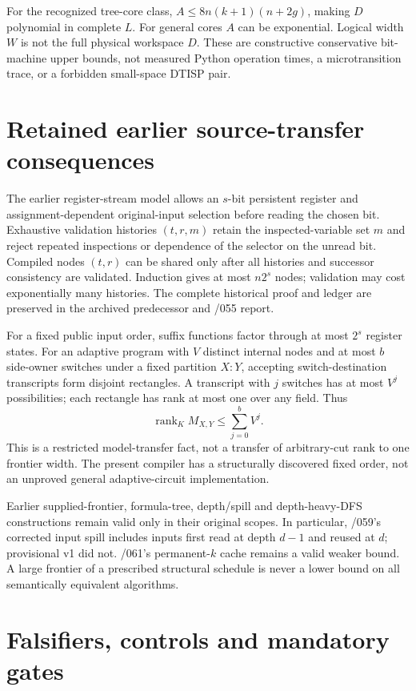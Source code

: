\documentclass[11pt]{article}
\begin{document}
For the recognized tree-core class, $A\le8n(k+1)(n+2g)$, making $D$ polynomial in complete $L$. For general cores $A$ can be exponential. Logical width $W$ is not the full physical workspace $D$. These are constructive conservative bit-machine upper bounds, not measured Python operation times, a microtransition trace, or a forbidden small-space DTISP pair.

\section{Retained earlier source-transfer consequences}
The earlier register-stream model allows an $s$-bit persistent register and assignment-dependent original-input selection before reading the chosen bit. Exhaustive validation histories $(t,r,m)$ retain the inspected-variable set $m$ and reject repeated inspections or dependence of the selector on the unread bit. Compiled nodes $(t,r)$ can be shared only after all histories and successor consistency are validated. Induction gives at most $n2^s$ nodes; validation may cost exponentially many histories. The complete historical proof and ledger are preserved in the archived predecessor and /055 report.

For a fixed public input order, suffix functions factor through at most $2^s$ register states. For an adaptive program with $V$ distinct internal nodes and at most $b$ side-owner switches under a fixed partition $X:Y$, accepting switch-destination transcripts form disjoint rectangles. A transcript with $j$ switches has at most $V^j$ possibilities; each rectangle has rank at most one over any field. Thus
\[
 \operatorname{rank}_K M_{X,Y}\le\sum_{j=0}^b V^j.
\]
This is a restricted model-transfer fact, not a transfer of arbitrary-cut rank to one frontier width. The present compiler has a structurally discovered fixed order, not an unproved general adaptive-circuit implementation.

Earlier supplied-frontier, formula-tree, depth/spill and depth-heavy-DFS constructions remain valid only in their original scopes. In particular, /059's corrected input spill includes inputs first read at depth $d-1$ and reused at $d$; provisional v1 did not. /061's permanent-$k$ cache remains a valid weaker bound. A large frontier of a prescribed structural schedule is never a lower bound on all semantically equivalent algorithms.

\section{Falsifiers, controls and mandatory gates}
\end{document}
